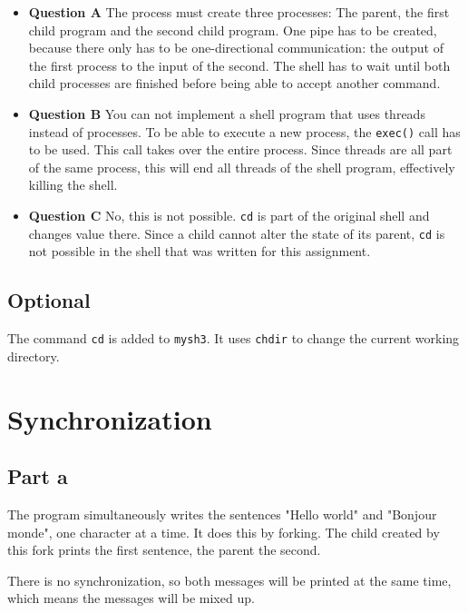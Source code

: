 \documentclass[a4paper]{article}
\begin{document}
\begin{itemize}
    \item \textbf{Question A} The process must create three processes: The parent, the 
            first child program and the second child program. One pipe has to be created,
            because there only has to be one-directional communication: the output of the
            first process to the input of the second. The shell has to wait until both
            child processes are finished before being able to accept another command.
    \item \textbf{Question B} You can not implement a shell program that uses threads
            instead of processes. To be able to execute a new process, the \texttt{exec()}
            call has to be used. This call takes over the entire process. Since threads
            are all part of the same process, this will end all threads of the shell 
            program, effectively killing the shell.
    \item \textbf{Question C} No, this is not possible. \texttt{cd} is part of the 
            original shell and changes value there. Since a child cannot alter the state
            of its parent, \texttt{cd} is not possible in the shell that was written for 
            this assignment.
\end{itemize}

\subsection{Optional}

The command \texttt{cd} is added to \texttt{mysh3}. It uses \texttt{chdir} to change the
current working directory.

\section{Synchronization}

\subsection{Part a}

The program simultaneously writes the sentences "Hello world" and "Bonjour monde", one
character at a time. It does this by forking. The child created by this fork prints the
first sentence, the parent the second.

There is no synchronization, so both messages will be printed at the same time, which
means the messages will be mixed up.
\end{document}
